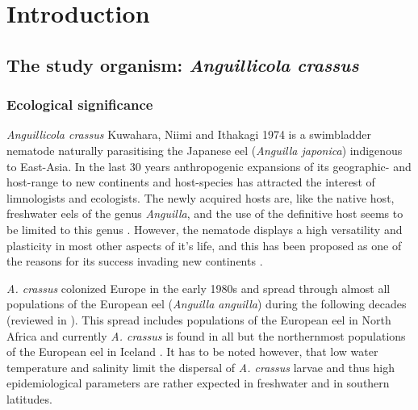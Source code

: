 

\chapter{Introduction}
\label{chap:intro}
\ifpdf
    \graphicspath{{1_introduction/figures/PNG/}{1_introduction/figures/PDF/}{1_introduction/figures/}}
\else
    \graphicspath{{1_introduction/figures/EPS/}{1_introduction/figures/}}
\fi


\section{The study organism: \textit{Anguillicola crassus}} 
\label{stud-org}

\subsection{Ecological significance} 
\label{eco-sig}

\textit{Anguillicola crassus} Kuwahara, Niimi and Ithakagi 1974
\cite{kuwahara_Niimi_Itagaki_1974} is a swimbladder nematode naturally
parasitising the Japanese eel (\textit{Anguilla japonica}) indigenous
to East-Asia. In the last 30 years anthropogenic expansions of its
geographic- and host-range to new continents and host-species has
attracted the interest of limnologists and ecologists. The newly
acquired hosts are, like the native host, freshwater eels of the genus
\textit{Anguilla}, and the use of the definitive host seems to be
limited to this genus \cite{sures_development_1999}. However, the
nematode displays a high versatility and plasticity in most other
aspects of it's life, and this has been proposed as one of the reasons
for its success invading new continents
\cite{taraschewski_hosts_2007}.

\textit{A. crassus} colonized Europe in the early 1980s and spread
through almost all populations of the European eel (\textit{Anguilla
  anguilla}) during the following decades (reviewed in
\cite{kirk_impact_2003}). This spread includes populations of the
European eel in North Africa
\cite{gargouri_ben_abdallah_spatio-temporal_2006,
  loukili_dynamics_2007} and currently \textit{A. crassus} is found in
all but the northernmost populations of the European eel in Iceland
\cite{kristmundsson_parasite_2007}. It has to be noted however, that
low water temperature \cite{knopf_impact_1998} and salinity
\cite{kirk_effect_2000} limit the dispersal of \textit{A. crassus}
larvae and thus high epidemiological parameters are rather expected in
freshwater and in southern latitudes.

